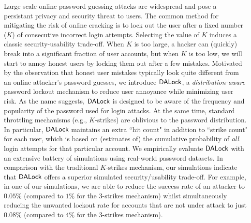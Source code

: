 Large-scale online password guessing attacks are widespread and pose a persistant privacy and security threat to users. The common method for mitigating the risk of online cracking is to lock out the user after a fixed number ($K$) of consecutive incorrect login attempts. Selecting the value of $K$ induces a classic security-usability trade-off. When $K$ is too large, a hacker can (quickly) break into a significant fraction of user accounts, but when $K$ is too low, we will start to annoy honest users by locking them out after a few mistakes. Motivated by the observation that honest user mistakes typically look quite different from an online attacker's password guesses, we introduce $\mathsf{DALock}$, a {\em distribution-aware} password lockout mechanism to reduce user annoyance while minimizing user risk. As the name suggests, $\mathsf{DALock}$ is designed to be aware of the frequency and popularity of the password used for login attacks. At the same time, standard throttling mechanisms (e.g., $K$-strikes) are oblivious to the password distribution. In particular, $\mathsf{DALock}$ maintains an extra ``hit count" in addition to ``strike count" for each user, which is based on (estimates of) the cumulative probability of {\em all} login attempts for that particular account. We empirically evaluate $\mathsf{DALock}$ with an extensive battery of simulations using real-world password datasets. In comparison with the traditional $K$-strikes mechanism, {our simulations indicate that} $\mathsf{DALock}$ offers a superior {simulated} security/usability trade-off. For example, in one of our simulations, we are able to reduce the success rate of an attacker to $0.05\%$ (compared to $1\%$ for the $3$-strikes mechanism) whilst simultaneously reducing the unwanted lockout rate for accounts that are not under attack to just $0.08\%$ (compared to $4\%$ for the $3$-strikes mechanism).  